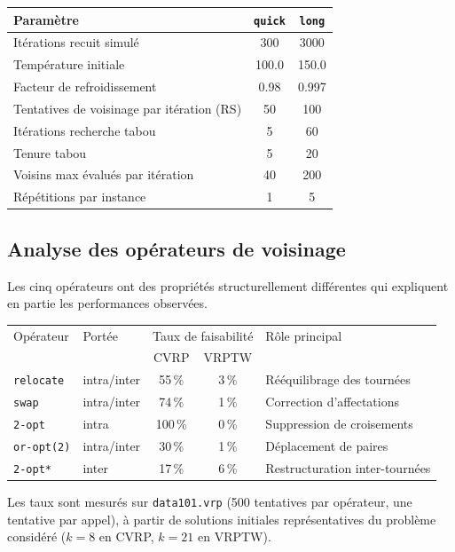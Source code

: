 \documentclass[11pt,a4paper]{article}
\begin{document}
\begin{center}
\begin{tabular}{lcc}
\toprule
Paramètre & \texttt{quick} & \texttt{long} \\
\midrule
Itérations recuit simulé & 300 & 3000 \\
Température initiale & 100.0 & 150.0 \\
Facteur de refroidissement & 0.98 & 0.997 \\
Tentatives de voisinage par itération (RS) & 50 & 100 \\
Itérations recherche tabou & 5 & 60 \\
Tenure tabou & 5 & 20 \\
Voisins max évalués par itération & 40 & 200 \\
Répétitions par instance & 1 & 5 \\
\bottomrule
\end{tabular}
\end{center}

\subsection{Analyse des opérateurs de voisinage}
\label{sec:operateurs}

Les cinq opérateurs ont des propriétés structurellement différentes qui expliquent en partie les performances observées.

\begin{center}
\begin{tabular}{llccl}
\toprule
Opérateur & Portée & \multicolumn{2}{c}{Taux de faisabilité} & Rôle principal \\
          &        & CVRP & VRPTW & \\
\midrule
\texttt{relocate}  & intra/inter & 55\,\% & 3\,\%  & Rééquilibrage des tournées \\
\texttt{swap}      & intra/inter & 74\,\% & 1\,\%  & Correction d'affectations \\
\texttt{2-opt}     & intra       &100\,\% & 0\,\%  & Suppression de croisements \\
\texttt{or-opt(2)} & intra/inter & 30\,\% & 1\,\%  & Déplacement de paires \\
\texttt{2-opt*}    & inter       & 17\,\% & 6\,\%  & Restructuration inter-tournées \\
\bottomrule
\end{tabular}
\end{center}

Les taux sont mesurés sur \texttt{data101.vrp} (500 tentatives par opérateur, une tentative par appel), à partir de solutions initiales représentatives du problème considéré ($k=8$ en CVRP, $k=21$ en VRPTW).
\end{document}
